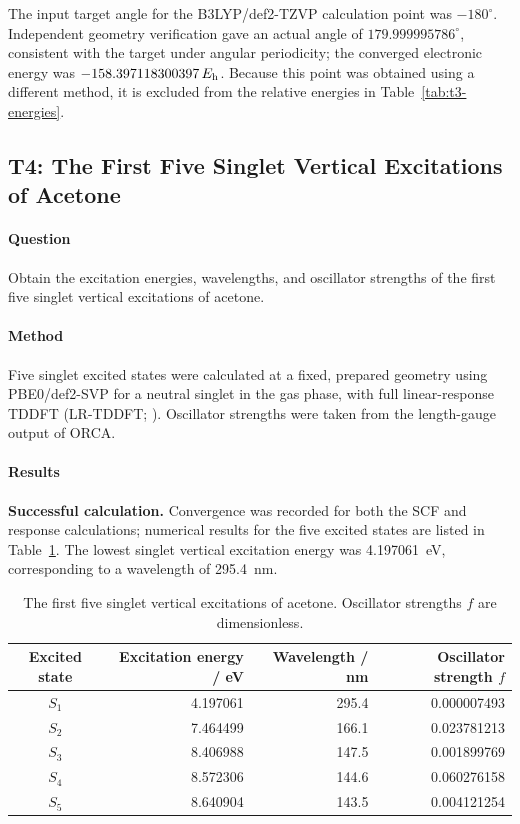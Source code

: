The input target angle for the B3LYP/def2-TZVP calculation point was $-180^\circ$.
Independent geometry verification gave an actual angle of $179.999995786^\circ$, consistent with the target under angular periodicity;
the converged electronic energy was $-158.397118300397\,E_{\mathrm h}$.
Because this point was obtained using a different method, it is excluded from the relative energies in Table~\ref{tab:t3-energies}.

\subsection{T4: The First Five Singlet Vertical Excitations of Acetone}
\paragraph{Question}
Obtain the excitation energies, wavelengths, and oscillator strengths of the first five singlet vertical excitations of acetone.

\paragraph{Method}
Five singlet excited states were calculated at a fixed, prepared geometry using PBE0/def2-SVP for a neutral singlet in the gas phase,
with full linear-response TDDFT (LR-TDDFT; ).
Oscillator strengths were taken from the length-gauge output of ORCA.

\paragraph{Results}
\textbf{Successful calculation.} Convergence was recorded for both the SCF and response calculations; numerical results for the five excited states are listed in Table~\ref{tab:t4-excitations}.
The lowest singlet vertical excitation energy was 4.197061~eV, corresponding to a wavelength of 295.4~nm.

\begin{table}[H]
  \centering\small
  \caption{The first five singlet vertical excitations of acetone.
  Oscillator strengths $f$ are dimensionless.
  }
  \label{tab:t4-excitations}
  \begin{tabular}{crrr}
    \toprule
    Excited state & Excitation energy / eV & Wavelength / nm & Oscillator strength $f$\\
    \midrule
    $S_{1}$ & 4.197061 & 295.4 & 0.000007493\\
    $S_{2}$ & 7.464499 & 166.1 & 0.023781213\\
    $S_{3}$ & 8.406988 & 147.5 & 0.001899769\\
    $S_{4}$ & 8.572306 & 144.6 & 0.060276158\\
    $S_{5}$ & 8.640904 & 143.5 & 0.004121254\\
    \bottomrule
  \end{tabular}
\end{table}

